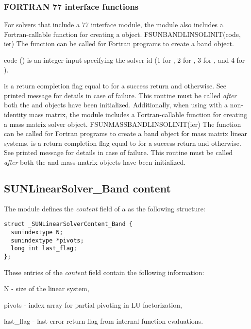 \subsubsection*{FORTRAN 77 interface functions}
For solvers that include a {\F} 77 interface module, the {\sunlinsolband}
module also includes a Fortran-callable function for creating a
 object.
%
%
{
  FSUNBANDLINSOLINIT(code, ier)
}
{
  The function  can be called for Fortran programs
  to create a band  object.
}
{
  \begin{args}[code]
  \item[code] ()
    is an integer input specifying the solver id (1 for {\cvode}, 2
    for {\ida}, 3 for {\kinsol}, and 4 for {\arkode}).
  \end{args}
}
{
   is a return completion flag equal to  for a success
  return and  otherwise. See printed message for details in case
  of failure.
}
{
  This routine must be
  called \emph{after} both the {\nvector} and {\sunmatrix} objects have
  been initialized.
}
Additionally, when using {\arkode} with a non-identity
mass matrix, the {\sunlinsolband} module includes a Fortran-callable
function for creating a  mass matrix solver
object.
%
%
{
  FSUNMASSBANDLINSOLINIT(ier)
}
{
  The function  can be called for Fortran programs
  to create a band  object for mass matrix linear
  systems.
}
{}
{
   is a  return completion flag equal to  for a success
  return and  otherwise. See printed message for details in case
  of failure.
}
{
  This routine must be
  called \emph{after} both the {\nvector} and {\sunmatrix} mass-matrix
  objects have been initialized.
}


\subsection{SUNLinearSolver\_Band content}
\label{ss:sunlinsol_band_content}

The {\sunlinsolband} module defines the \textit{content} field of a
 as the following structure:
\begin{verbatim} 
struct _SUNLinearSolverContent_Band {
  sunindextype N;
  sunindextype *pivots;
  long int last_flag;
};
\end{verbatim}
These entries of the \emph{content} field contain the following
information:
\begin{args}
  \item[N] - size of the linear system,
  \item[pivots] - index array for partial pivoting in LU factorization,
  \item[last\_flag] - last error return flag from internal function evaluations.
\end{args}

